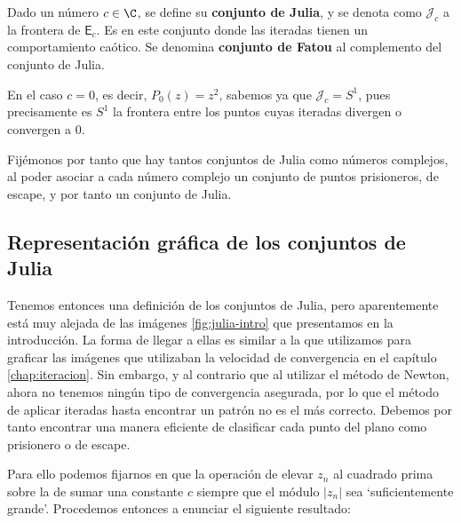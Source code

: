 \begin{definicion}
Dado un número $c\in\C$, se define su \textbf{conjunto de Julia}, y se denota como $\mathcal{J}_c$ a la frontera de $\mathsf{E}_c$. Es en este conjunto donde las iteradas tienen un comportamiento caótico. Se denomina \textbf{conjunto de Fatou} al complemento del conjunto de Julia.
\end{definicion}



\begin{ejemplo}
  En el caso $c=0$, es decir, $P_0(z)=z^2$, sabemos ya que $\mathcal{J}_c=S^1$, pues precisamente es $S^1$ la frontera entre los puntos cuyas iteradas divergen o convergen a $0$.
\end{ejemplo}

\begin{observacion}
  Fijémonos por tanto que hay tantos conjuntos de Julia como números complejos, al poder asociar a cada número complejo un conjunto de puntos prisioneros, de escape, y por tanto un conjunto de Julia.
\end{observacion}

\subsection{Representación gráfica de los conjuntos de Julia}
\label{subsection:representacion-julia}

Tenemos entonces una definición de los conjuntos de Julia, pero aparentemente está muy alejada de las imágenes \ref{fig:julia-intro} que presentamos en la introducción. La forma de llegar a ellas es similar a la que utilizamos para graficar las imágenes que utilizaban la velocidad de convergencia en el capítulo \ref{chap:iteracion}. Sin embargo, y al contrario que al utilizar el método de Newton, ahora no tenemos ningún tipo de convergencia asegurada, por lo que el método de aplicar iteradas hasta encontrar un patrón no es el más correcto. Debemos por tanto encontrar una manera eficiente de clasificar cada punto del plano como prisionero o de escape. 

Para ello podemos fijarnos en que la operación de elevar $z_n$ al cuadrado prima sobre la de sumar una constante $c$ siempre que el módulo $|z_n|$ sea `suficientemente grande'. Procedemos entonces a enunciar el siguiente resultado:


